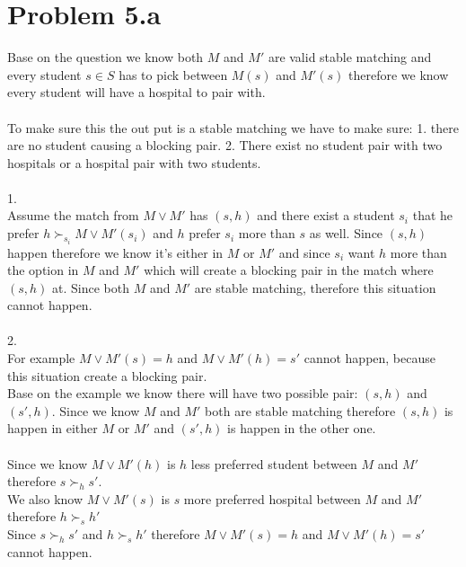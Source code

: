 \documentclass{article}
\begin{document}
\section{Problem 5.a}
Base on the question we know both $M$ and $M'$ are valid stable matching and every student $s \in S$ has to pick between $M(s)$ and $M'(s)$ therefore we know every student will have a hospital to pair with.\\\\
To make sure this the out put is a stable matching we have to make sure: 
1. there are no student causing a blocking pair.
2. There exist no student pair with two hospitals or a hospital pair with two students.\\\\
1.\\
Assume the match from $M\lor M'$ has $(s,h)$ and there exist a student $s_i$ that he prefer $h \succ_{s_i}M\lor M'(s_i)$ and $h$ prefer $s_i$ more than $s$ as well. Since $(s,h)$ happen therefore we know it's either in $M$ or $M'$ and since $s_i$ want $h$ more than the option in $M$ and $M'$ which will create a blocking pair in the match where $(s,h)$ at. Since both $M$ and $M'$ are stable matching, therefore this situation cannot happen.\\\\
2.\\
For example $M\lor M'(s) = h$ and $M\lor M'(h) = s'$ cannot happen, because this situation create a blocking pair.\\
Base on the example we know there will have two possible pair: $(s,h)$ and $(s',h)$. Since we know $M$ and $M'$ both are stable matching therefore $(s,h)$ is happen in either $M$ or $M'$ and $(s',h)$ is happen in the other one.\\\\
Since we know $M \lor M'(h)$ is $h$ less preferred student between $M$ and $M'$ therefore $s \succ_h s'$.\\
We also know $M\lor M'(s)$ is $s$ more preferred hospital between $M$ and $M'$ therefore $h \succ_s h'$\\
Since $s \succ_h s'$ and $h \succ_s h'$ therefore $M\lor M'(s) = h$ and $M\lor M'(h) = s'$ cannot happen.

\newpage
\end{document}
